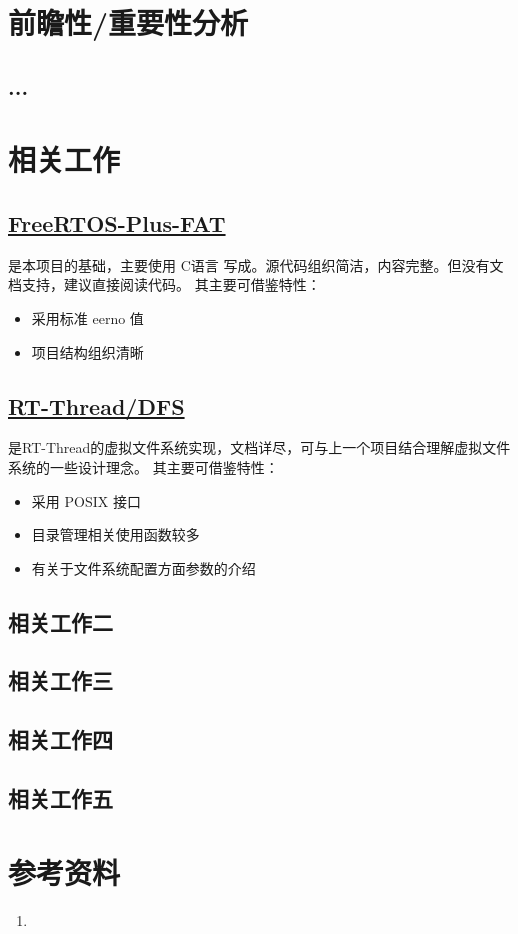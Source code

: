\documentclass[UTF8,a4paper]{ctexart}
\begin{document}
\section{前瞻性/重要性分析}
\subsection{...}
\section{相关工作}
\subsection{\href{https://www.freertos.org/zh-cn-cmn-s/FreeRTOS-Plus/FreeRTOS_Plus_FAT/index.html}{FreeRTOS-Plus-FAT}}
是本项目的基础，主要使用 C语言 写成。源代码组织简洁，内容完整。但没有文档支持，建议直接阅读代码。
其主要可借鉴特性：
\begin{itemize}
    \item 采用标准 eerno 值
    \item 项目结构组织清晰
\end{itemize}
\subsection{\href{https://www.rt-thread.org/document/site/\#/rt-thread-version/rt-thread-standard/programming-manual/filesystem/filesystem}{RT-Thread/DFS}}
是RT-Thread的虚拟文件系统实现，文档详尽，可与上一个项目结合理解虚拟文件系统的一些设计理念。
其主要可借鉴特性：
\begin{itemize}
    \item 采用 POSIX 接口
    \item 目录管理相关使用函数较多
    \item 有关于文件系统配置方面参数的介绍
\end{itemize}

\subsection{相关工作二}
\subsection{相关工作三}
\subsection{相关工作四}
\subsection{相关工作五}

\section{参考资料}
\begin{enumerate}
    \item 
    
\end{enumerate}
\end{document}
